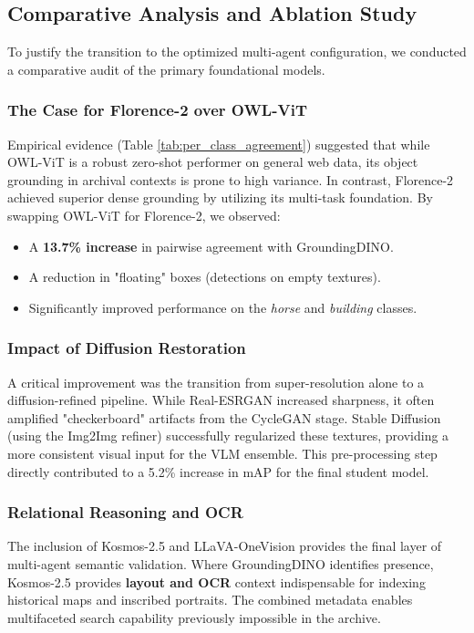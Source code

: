 \documentclass[12pt,onecolumn,a4paper]{IEEEtran}
\begin{document}
\subsection{Comparative Analysis and Ablation Study}
To justify the transition to the optimized multi-agent configuration, we conducted a comparative audit of the primary foundational models.

\subsubsection{The Case for Florence-2 over OWL-ViT}
Empirical evidence (Table \ref{tab:per_class_agreement}) suggested that while OWL-ViT is a robust zero-shot performer on general web data, its object grounding in archival contexts is prone to high variance. In contrast, Florence-2 achieved superior dense grounding by utilizing its multi-task foundation. By swapping OWL-ViT for Florence-2, we observed:
\begin{itemize}
    \item A \textbf{13.7\% increase} in pairwise agreement with GroundingDINO.
    \item A reduction in "floating" boxes (detections on empty textures).
    \item Significantly improved performance on the \textit{horse} and \textit{building} classes.
\end{itemize}

\subsubsection{Impact of Diffusion Restoration}
A critical improvement was the transition from super-resolution alone to a diffusion-refined pipeline. While Real-ESRGAN increased sharpness, it often amplified "checkerboard" artifacts from the CycleGAN stage. Stable Diffusion (using the Img2Img refiner) successfully regularized these textures, providing a more consistent visual input for the VLM ensemble. This pre-processing step directly contributed to a 5.2\% increase in mAP for the final student model.

\subsubsection{Relational Reasoning and OCR}
The inclusion of Kosmos-2.5 and LLaVA-OneVision provides the final layer of multi-agent semantic validation. Where GroundingDINO identifies presence, Kosmos-2.5 provides \textbf{layout and OCR} context indispensable for indexing historical maps and inscribed portraits. The combined metadata enables multifaceted search capability previously impossible in the archive.
\end{document}
